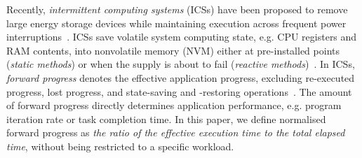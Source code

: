 Recently, \textit{intermittent computing systems} (ICSs) have been proposed to remove large energy storage devices while maintaining execution across frequent power interruptions~\cite{Ransford:2011:MSS:1950365.1950386, 6733152, 6960060, Lucia:2015:SSP:2737924.2737978, 6341281, 199319}. ICSs save volatile system computing state, e.g. CPU registers and RAM contents, into nonvolatile memory (NVM) either at pre-installed points (\textit{static methods}) or when the supply is about to fail (\textit{reactive methods})~\cite{Sliper:2019:ESR:3316781.3317812, doi:10.1098/rsta.2019.0158}. 
In ICSs, \textit{forward progress} denotes the effective application progress, excluding re-executed progress, lost progress, and state-saving and -restoring operations~\cite{7478428, 7056060}. The amount of forward progress directly determines application performance, e.g. program iteration rate or task completion time. In this paper, we define normalised forward progress as \textit{the ratio of the effective execution time to the total elapsed time}, without being restricted to a specific workload. 



